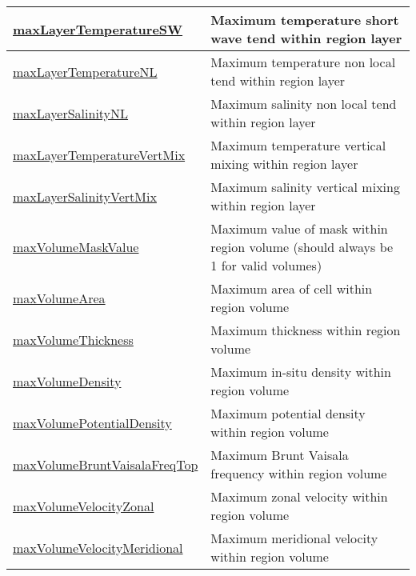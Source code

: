 {\begin{center}
\begin{longtable}{| p{2.0in} | p{4.0in} |}
    \hline
    \hyperref[subsec:var_sec_layerVolumeWeightedAverageAM_maxLayerTemperatureSW]{maxLayerTemperatureSW} & Maximum temperature short wave tend within region layer \\
    \hline
    \hyperref[subsec:var_sec_layerVolumeWeightedAverageAM_maxLayerTemperatureNL]{maxLayerTemperatureNL} & Maximum temperature non local tend within region layer \\
    \hline
    \hyperref[subsec:var_sec_layerVolumeWeightedAverageAM_maxLayerSalinityNL]{maxLayerSalinityNL} & Maximum salinity non local tend within region layer \\
    \hline
    \hyperref[subsec:var_sec_layerVolumeWeightedAverageAM_maxLayerTemperatureVertMix]{maxLayerTemperatureVertMix} & Maximum temperature vertical mixing within region layer \\
    \hline
    \hyperref[subsec:var_sec_layerVolumeWeightedAverageAM_maxLayerSalinityVertMix]{maxLayerSalinityVertMix} & Maximum salinity vertical mixing within region layer \\
    \hline
    \hyperref[subsec:var_sec_layerVolumeWeightedAverageAM_maxVolumeMaskValue]{maxVolumeMaskValue} & Maximum value of mask within region volume (should always be 1 for valid volumes) \\
    \hline
    \hyperref[subsec:var_sec_layerVolumeWeightedAverageAM_maxVolumeArea]{maxVolumeArea} & Maximum area of cell within region volume \\
    \hline
    \hyperref[subsec:var_sec_layerVolumeWeightedAverageAM_maxVolumeThickness]{maxVolumeThickness} & Maximum thickness within region volume \\
    \hline
    \hyperref[subsec:var_sec_layerVolumeWeightedAverageAM_maxVolumeDensity]{maxVolumeDensity} & Maximum in-situ density within region volume \\
    \hline
    \hyperref[subsec:var_sec_layerVolumeWeightedAverageAM_maxVolumePotentialDensity]{maxVolumePotentialDensity} & Maximum potential density within region volume \\
    \hline
    \hyperref[subsec:var_sec_layerVolumeWeightedAverageAM_maxVolumeBruntVaisalaFreqTop]{maxVolumeBruntVaisalaFreqTop} & Maximum Brunt Vaisala frequency within region volume \\
    \hline
    \hyperref[subsec:var_sec_layerVolumeWeightedAverageAM_maxVolumeVelocityZonal]{maxVolumeVelocityZonal} & Maximum zonal velocity within region volume \\
    \hline
    \hyperref[subsec:var_sec_layerVolumeWeightedAverageAM_maxVolumeVelocityMeridional]{maxVolumeVelocityMeridional} & Maximum meridional velocity within region volume \\

\end{longtable}
\end{center}}

